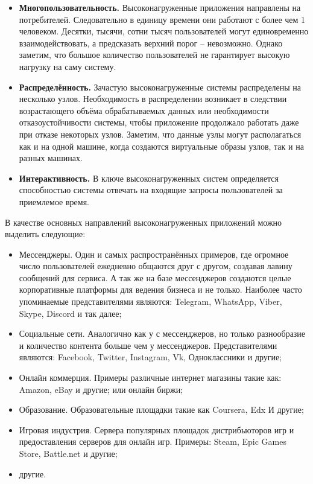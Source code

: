 \begin{itemize}
	\item \textbf{Многопользовательность.} Высоконагруженные приложения направлены на потребителей. Следовательно в единицу времени они работают с более чем 1 человеком. Десятки, тысячи, сотни тысяч пользователей могут единовременно взаимодействовать, а предсказать верхний порог – невозможно. Однако заметим, что большое количество пользователей не гарантирует высокую нагрузку на саму систему.
	\item \textbf{Распределённость.} Зачастую высоконагруженные системы распределены на несколько узлов. Необходимость в распределении возникает в следствии возрастающего объёма обрабатываемых данных или необходимости отказоустойчивости системы, чтобы приложение продолжало работать даже при отказе некоторых узлов. Заметим, что данные узлы могут располагаться как и на одной машине, когда создаются виртуальные образы узлов, так и на разных машинах.
	\item \textbf{Интерактивность.} В ключе высоконагруженных систем определяется способностью системы отвечать на входящие запросы пользователей за приемлемое время.
\end{itemize}

В качестве основных направлений высоконагруженных приложений можно выделить следующие: \cite{souders2008high, Nodejs82:online}

\begin{itemize}
	\item Мессенджеры. Один и самых распространённых примеров, где огромное число пользователей ежедневно общаются друг с другом, создавая лавину сообщений для сервиса. А так же на базе мессенджеров создаются целые корпоративные платформы для ведения бизнеса и не только. Наиболее часто упоминаемые представителями являются: Telegram, WhatsApp, Viber, Skype, Discord и так далее;
	\item Социальные сети. Аналогично как у с мессенджеров, но только разнообразие и количество контента больше чем у мессенджеров. Представителями являются: Facebook, Twitter, Instagram, Vk, Одноклассники и другие;
	\item Онлайн коммерция. Примеры различные интернет магазины такие как: Amazon, eBay и другие; или онлайн биржи;
	\item Образование. Образовательные площадки такие как Coursera, Edx И другие;
	\item Игровая индустрия. Сервера популярных площадок дистрибьюторов игр и предоставления серверов для онлайн игр. Примеры: Steam, Epic Games Store, Battle.net и другие;
	\item другие.
\end{itemize}

